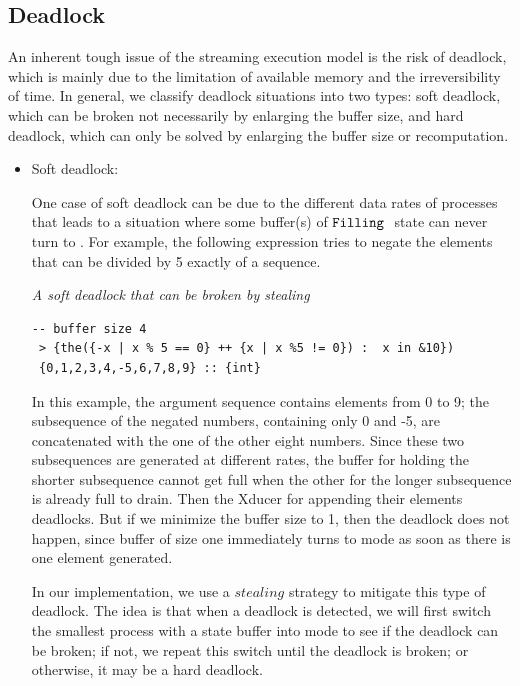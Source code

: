

\subsection{Deadlock}
An inherent tough issue of the streaming execution model is the risk of deadlock, which is mainly due to the limitation of available memory and the irreversibility of time.
In general, we classify deadlock situations into two types: soft deadlock, which can be broken not necessarily by enlarging the buffer size, and hard deadlock, which can only be solved by enlarging the buffer size or recomputation. 

\begin{itemize}

\item Soft deadlock: 

One case of soft deadlock can be due to the different data rates of processes that leads to a situation where some buffer(s) of $\texttt{Filling} \ $ state can never turn to \draining. 
For example, the following expression tries to negate the elements that can be divided by 5 exactly of a sequence.
\begin{example}\emph{ A soft deadlock that can be broken by stealing}
\end{example}
\begin{lstlisting}[style=nesl-style]
  -- buffer size 4 
 > {the({-x | x % 5 == 0} ++ {x | x %5 != 0}) :  x in &10})
 {0,1,2,3,4,-5,6,7,8,9} :: {int}
\end{lstlisting}


In this example, the argument sequence contains elements from 0 to 9; the subsequence of the negated numbers, containing only 0 and -5, are concatenated with the one of the other eight numbers. 
Since these two subsequences are generated at different rates,
the buffer for holding the shorter subsequence cannot get full when the other for the longer subsequence is already full to drain.
Then the Xducer for appending their elements deadlocks.
But if we minimize the buffer size to 1, then the deadlock does not happen, since buffer of size one immediately turns to \draining mode as soon as there is one element generated. 

In our implementation, we use a $stealing$ strategy to mitigate this type of deadlock. 
The idea is that when a deadlock is detected, we will first switch the smallest process with a \filling state buffer into \draining mode to see if the deadlock can be broken; if not, we repeat this switch until the deadlock is broken; or otherwise, it may be a hard deadlock.


\end{itemize}
